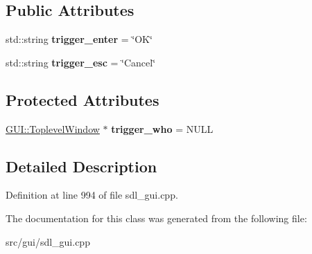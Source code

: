 \subsection*{Public Attributes}
\begin{DoxyCompactItemize}
\item 
\hypertarget{classInputWithEnterKey_ab1f039aa213cc2c6d189a712c456958e}{std\-::string {\bfseries trigger\-\_\-enter} = \char`\"{}O\-K\char`\"{}}\label{classInputWithEnterKey_ab1f039aa213cc2c6d189a712c456958e}

\item 
\hypertarget{classInputWithEnterKey_ad0f1644bc2918baa46e8c63d3193b3fe}{std\-::string {\bfseries trigger\-\_\-esc} = \char`\"{}Cancel\char`\"{}}\label{classInputWithEnterKey_ad0f1644bc2918baa46e8c63d3193b3fe}

\end{DoxyCompactItemize}
\subsection*{Protected Attributes}
\begin{DoxyCompactItemize}
\item 
\hypertarget{classInputWithEnterKey_a28afbaf196623f3534601338135fb6ea}{\hyperlink{classGUI_1_1ToplevelWindow}{G\-U\-I\-::\-Toplevel\-Window} $\ast$ {\bfseries trigger\-\_\-who} = N\-U\-L\-L}\label{classInputWithEnterKey_a28afbaf196623f3534601338135fb6ea}

\end{DoxyCompactItemize}


\subsection{Detailed Description}


Definition at line 994 of file sdl\-\_\-gui.\-cpp.



The documentation for this class was generated from the following file\-:\begin{DoxyCompactItemize}
\item 
src/gui/sdl\-\_\-gui.\-cpp\end{DoxyCompactItemize}
